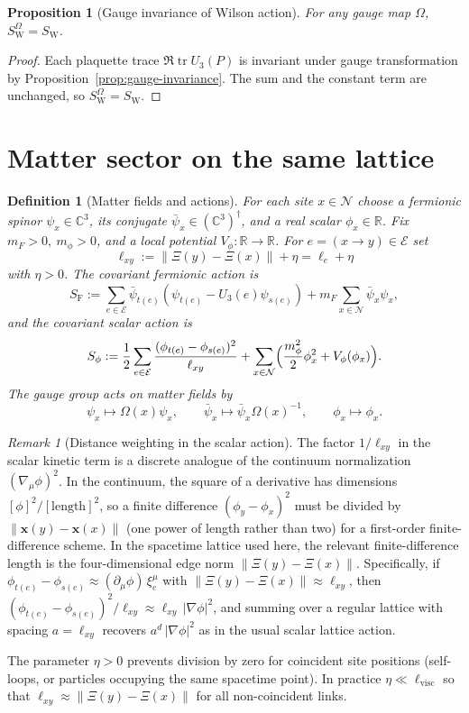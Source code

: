 \documentclass[11pt]{article}
\newtheorem{definition}[theorem]{Definition}
\newtheorem{proposition}[theorem]{Proposition}
\theoremstyle{remark}
\newtheorem{remark}[theorem]{Remark}
\newcommand{\R}{\mathbb R}
\newcommand{\C}{\mathbb C}
\newcommand{\mcN}{\mathcal N}
\newcommand{\mcE}{\mathcal E}
\newcommand{\tr}{\operatorname{tr}}
\begin{document}
\begin{proposition}[Gauge invariance of Wilson action]
\label{prop:wilson-gauge}
For any gauge map $\Omega$, $S_{\mathrm W}^\Omega=S_{\mathrm W}$.
\end{proposition}
\begin{proof}
Each plaquette trace $\Re\tr U_3(P)$ is invariant under gauge transformation by
Proposition~\ref{prop:gauge-invariance}.
The sum and the constant term are unchanged, so $S_{\mathrm W}^\Omega=S_{\mathrm W}$.
\end{proof}

\section{Matter sector on the same lattice}
\label{sec:matter}

\begin{definition}[Matter fields and actions]
\label{def:matter}
For each site $x\in\mcN$ choose a fermionic spinor $\psi_x\in\C^3$,
its conjugate $\bar\psi_x\in(\C^3)^\dagger$, and a real scalar $\phi_x\in\R$.
Fix $m_F>0,\ m_\phi>0$, and a local potential $V_\phi:\R\to\R$.
For $e=(x\to y)\in\mcE$ set
\[
\ell_{xy}:=\|\Xi(y)-\Xi(x)\|+\eta=\ell_e+\eta
\]
with $\eta>0$.
The covariant fermionic action is
\[
S_{\mathrm F}:=\sum_{e\in\mcE}\bar\psi_{t(e)}\left(\psi_{t(e)}-U_3(e)\psi_{s(e)}\right)
+m_F\sum_{x\in\mcN}\bar\psi_x\psi_x,
\]
and the covariant scalar action is
\[
S_\phi:=\frac12\sum_{e\in\mcE}\frac{(\phi_{t(e)}-\phi_{s(e)})^2}{\ell_{xy}}
+\sum_{x\in\mcN}\Bigl(\frac{m_\phi^2}{2}\phi_x^2+V_\phi(\phi_x)\Bigr).
\]
The gauge group acts on matter fields by
\[
\psi_x\mapsto\Omega(x)\psi_x,\qquad
\bar\psi_x\mapsto\bar\psi_x\Omega(x)^{-1},\qquad
\phi_x\mapsto\phi_x.
\]
\end{definition}

\begin{remark}[Distance weighting in the scalar action]
\label{rem:distance-weight}
The factor $1/\ell_{xy}$ in the scalar kinetic term is a discrete analogue of
the continuum normalization $(\nabla_\mu\phi)^2$.
In the continuum, the square of a derivative has dimensions $[\phi]^2/[\text{length}]^2$,
so a finite difference $(\phi_y-\phi_x)^2$ must be divided by $\|\mathbf x(y)-\mathbf x(x)\|$
(one power of length rather than two) for a first-order finite-difference scheme.
In the spacetime lattice used here, the relevant finite-difference length is the
four-dimensional edge norm $\|\Xi(y)-\Xi(x)\|$.
Specifically, if $\phi_{t(e)}-\phi_{s(e)}\approx (\partial_\mu\phi)\,\xi_e^\mu$
with $\|\Xi(y)-\Xi(x)\|\approx\ell_{xy}$, then
$(\phi_{t(e)}-\phi_{s(e)})^2/\ell_{xy}\approx \ell_{xy}\,|\nabla\phi|^2$,
and summing over a regular lattice with spacing $a=\ell_{xy}$ recovers
$a^d\,|\nabla\phi|^2$ as in the usual scalar lattice action.

The parameter $\eta>0$ prevents division by zero for coincident site positions
(self-loops, or particles occupying the same spacetime point).
In practice $\eta\ll\ell_{\mathrm{visc}}$ so that $\ell_{xy}\approx\|\Xi(y)-\Xi(x)\|$
for all non-coincident links.
\end{remark}
\end{document}
